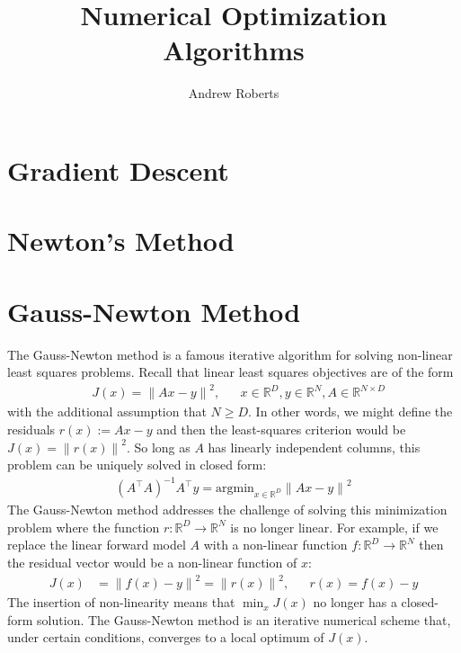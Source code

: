 \documentclass[12pt]{article}
\title{Numerical Optimization Algorithms}
\author{Andrew Roberts}
\newcommand*{\norm}[1]{\left\lVert#1\right\rVert}
\newcommand{\R}{\mathbb{R}}
\begin{document}
\maketitle
\tableofcontents
\newpage

\section{Gradient Descent}

\section{Newton's Method}

\section{Gauss-Newton Method}
The Gauss-Newton method is a famous iterative algorithm for solving non-linear least squares problems. Recall that linear least squares objectives are of the form 
\begin{align*}
&J(x) = \norm{Ax - y}^2, && x \in \R^D, y \in \R^N, A \in \R^{N \times D}
\end{align*}
with the additional assumption that $N \geq D$. 
In other words, we might define the residuals $r(x) := Ax - y$ and then the least-squares criterion would be $J(x) = \norm{r(x)}^2$. So long as $A$ has linearly independent columns, this 
problem can be uniquely solved in closed form:
\begin{align}
(A^\top A)^{-1} A^\top y = \text{argmin}_{x \in \R^D} \norm{Ax - y}^2 \label{linear_LS}
\end{align}
The Gauss-Newton method addresses the challenge of solving this minimization problem where the function $r: \R^D \to \R^N$ is no longer linear. For example, if we replace the linear forward 
model $A$ with a non-linear function $f: \R^D \to \R^N$ then the residual vector would be a non-linear function of $x$:
\begin{align*}
J(x) &= \norm{f(x) - y}^2 = \norm{r(x)}^2, && r(x) = f(x) - y
\end{align*}
The insertion of non-linearity means that $\min_{x} J(x)$ no longer has a closed-form solution. The Gauss-Newton method is an iterative numerical scheme that, under certain conditions, converges 
to a local optimum of $J(x)$.
\end{document}
